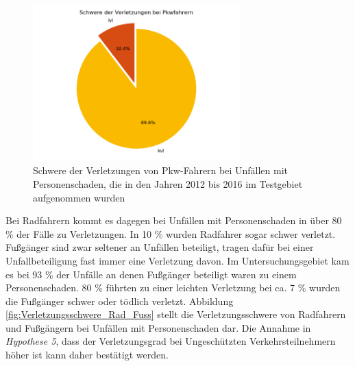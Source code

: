 \begin{savenotes}
	\begin{figure}[H]
		\centering
		\includegraphics[width=8cm,height=6cm]{figures/Verl_Pkw}
		\caption[Schwere der Verletzungen von Pkw-Fahrern bei Unfällen mit Personenschaden, die in den Jahren 2012 bis 2016 im Testgebiet aufgenommen wurden ]{Schwere der Verletzungen von Pkw-Fahrern bei Unfällen mit Personenschaden, die in den Jahren 2012 bis 2016 im Testgebiet aufgenommen wurden}\label{fig:Verletzungsschwere_Pkw}
	\end{figure}
\end{savenotes}

Bei Radfahrern kommt es dagegen bei Unfällen mit Personenschaden in über 80 \% der Fälle zu Verletzungen. In 10 \% wurden Radfahrer sogar schwer verletzt. Fußgänger sind zwar seltener an Unfällen beteiligt, tragen dafür bei einer Unfallbeteiligung fast immer eine Verletzung davon. Im Untersuchungsgebiet kam es bei 93 \% der Unfälle an denen Fußgänger beteiligt waren zu einem Personenschaden. 80 \% führten zu einer leichten Verletzung bei ca. 7 \% wurden die Fußgänger schwer oder tödlich verletzt. Abbildung \ref{fig:Verletzungsschwere_Rad_Fuss} stellt die Verletzungsschwere von Radfahrern und Fußgängern bei Unfällen mit Personenschaden dar. Die Annahme in \textit{Hypothese 5}, dass der Verletzungsgrad bei Ungeschützten Verkehrsteilnehmern höher ist kann daher bestätigt werden.

